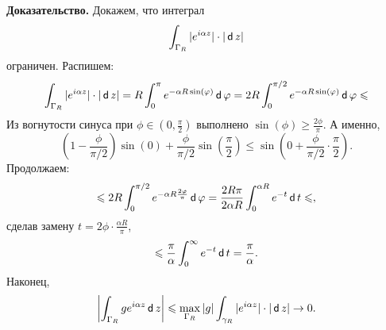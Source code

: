 \textbf{Доказательство.} Докажем, что интеграл
\[
    \int_{\Gamma_R} |e^{i\alpha z}| \cdot |\operatorname{\mathsf d} z|
\]
ограничен.
Распишем:
\[
    \int_{\Gamma_R} |e^{i\alpha z}| \cdot |\operatorname{\mathsf d} z| = R \int_0^\pi e^{-\alpha R \sin(\varphi)} \operatorname{\mathsf d} \varphi = 2R \int_0^{\pi/2} e^{-\alpha R \sin(\varphi)} \operatorname{\mathsf d} \varphi \leqslant
\]
Из вогнутости синуса при $\phi \in (0, \frac{\pi}{2})$ выполнено $\sin(\phi) \ge \frac{2\phi}{\pi}$.
А именно,
\[
    \left(1 - \frac{\phi}{\pi/2} \right) \sin(0) + \frac{\phi}{\pi/2} \sin \left( \frac{\pi}{2} \right) \le \sin \left( 0 + \frac{\phi}{\pi/2} \cdot \frac{\pi}{2} \right).
\]
Продолжаем:
\[
    \leqslant 2R \int_0^{\pi/2} e^{-\alpha R \frac{2\varphi}{\pi}} \operatorname{\mathsf d} \varphi = \frac{2R \pi}{2\alpha R} \int_0^{\alpha R} e^{-t} \operatorname{\mathsf d} t \leqslant,
\]
сделав замену $t = 2\phi \cdot \frac{\alpha R}{\pi}$,
\[
    \leqslant \frac{\pi}{\alpha} \int_0^\infty e^{-t} \operatorname{\mathsf d} t = \frac{\pi}{\alpha}.
\]
Наконец,
\[
    \left| \int_{\Gamma_R} g e^{i\alpha z} \operatorname{\mathsf d} z \right| \leqslant \max_{\Gamma_R} |g| \int_{\gamma_R} |e^{i\alpha z}| \cdot |\operatorname{\mathsf d} z| \to 0.
\]

\QED
